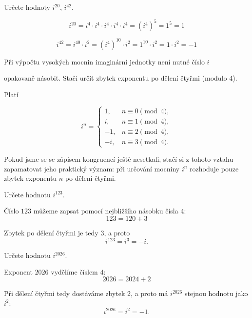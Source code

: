 \documentclass[12pt,a4paper]{article}
\begin{document}
\begin{examplebox}
    Určete hodnoty $i^{20}$, $i^{42}$.

    \begin{minipage}[t]{0.48\textwidth}
        \[
        i^{20}  = i^4\cdot i^4 \cdot i^4 \cdot i^4 \cdot i^4
                = (i^4)^{5}
                = 1^{5}
                = 1
        \]
    \end{minipage}

    \begin{minipage}[t]{0.48\textwidth}
        \[
        i^{42}  = i^{40}\cdot i^2
                = (i^4)^{10}\cdot i^2
                = 1^{10}\cdot i^2
                = 1\cdot i^2
                = -1
        \]
    \end{minipage}

\end{examplebox}



\begin{notebox}

Při výpočtu vysokých mocnin imaginární jednotky není nutné číslo \(i\)

opakovaně násobit. Stačí určit zbytek exponentu po dělení čtyřmi (modulo 4).

Platí

\[
i^n=
\begin{cases}
    1,  & n\equiv 0 \pmod{4},\\
    i,  & n\equiv 1 \pmod{4},\\
    -1, & n\equiv 2 \pmod{4},\\
    -i, & n\equiv 3 \pmod{4}.
\end{cases}
\]

Pokud jsme se se zápisem kongruencí ještě nesetkali, stačí si z tohoto vztahu
zapamatovat jeho praktický význam: při určování mocniny $i^n$ rozhoduje pouze
zbytek exponentu $n$ po dělení čtyřmi.

\end{notebox}

\begin{examplebox}
    Určete hodnotu $i^{123}$.
    
    Číslo $123$ můžeme zapsat pomocí nejbližšího násobku čísla $4$:
    \[
        123 = 120 + 3
    \]

    Zbytek po dělení čtyřmi je tedy $3$, a proto
    \[
        i^{123}=i^3=-i.
    \]

\end{examplebox}

\begin{examplebox}
    Určete hodnotu $i^{2026}$.
    
    Exponent $2026$ vydělíme číslem $4$:
    \[
        2026 = 2024 + 2
    \]

    Při dělení čtyřmi tedy dostáváme zbytek $2$, a proto má $i^{2026}$ stejnou
    hodnotu jako \(i^2\):
    \[
        i^{2026}=i^2=-1.
    \]
\end{examplebox}
\end{document}
